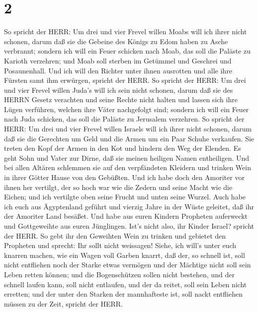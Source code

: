 \hypertarget{section-1}{%
\section{2}\label{section-1}}

 So spricht der HERR: Um drei und vier Frevel willen Moabs
will ich ihrer nicht schonen, darum daß sie die Gebeine des Königs zu
Edom haben zu Asche verbrannt;  sondern ich will ein Feuer
schicken nach Moab, das soll die Paläste zu Karioth verzehren; und Moab
soll sterben im Getümmel und Geschrei und Posaunenhall.  Und
ich will den Richter unter ihnen ausrotten und alle ihre Fürsten samt
ihm erwürgen, spricht der HERR.  So spricht der HERR: Um
drei und vier Frevel willen Juda's will ich sein nicht schonen, darum
daß sie des HERRN Gesetz verachten und seine Rechte nicht halten und
lassen sich ihre Lügen verführen, welchen ihre Väter nachgefolgt sind;
 sondern ich will ein Feuer nach Juda schicken, das soll die
Paläste zu Jerusalem verzehren.  So spricht der HERR: Um
drei und vier Frevel willen Israels will ich ihrer nicht schonen, darum
daß sie die Gerechten um Geld und die Armen um ein Paar Schuhe
verkaufen.  Sie treten den Kopf der Armen in den Kot und
hindern den Weg der Elenden. Es geht Sohn und Vater zur Dirne, daß sie
meinen heiligen Namen entheiligen.  Und bei allen Altären
schlemmen sie auf den verpfändeten Kleidern und trinken Wein in ihrer
Götter Hause von den Gebüßten.  Und ich habe doch den
Amoriter vor ihnen her vertilgt, der so hoch war wie die Zedern und
seine Macht wie die Eichen; und ich vertilgte oben seine Frucht und
unten seine Wurzel.  Auch habe ich euch aus Ägyptenland
geführt und vierzig Jahre in der Wüste geleitet, daß ihr der Amoriter
Land besäßet.  Und habe aus euren Kindern Propheten
auferweckt und Gottgeweihte aus euren Jünglingen. Ist's nicht also, ihr
Kinder Israel? spricht der HERR.  So gebt ihr den Geweihten
Wein zu trinken und gebietet den Propheten und sprecht: Ihr sollt nicht
weissagen!  Siehe, ich will's unter euch knarren machen,
wie ein Wagen voll Garben knarrt,  daß der, so schnell ist,
soll nicht entfliehen noch der Starke etwas vermögen und der Mächtige
nicht soll sein Leben retten können;  und die Bogenschützen
sollen nicht bestehen, und der schnell laufen kann, soll nicht
entlaufen, und der da reitet, soll sein Leben nicht erretten;
 und der unter den Starken der mannhafteste ist, soll nackt
entfliehen müssen zu der Zeit, spricht der HERR.

